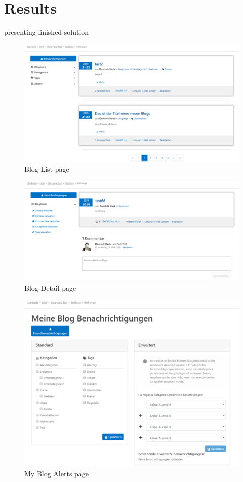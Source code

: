 \documentclass[Bachelor,BIF,english]{twbook}
\begin{document}
\section{Results}
presenting finished solution
\begin{figure}[!htbp]
\centering
\includegraphics[width=1\linewidth]{PICs/blog_list_page.eps}
\caption{Blog List page}\label{FigBlogList}
\end{figure}
\begin{figure}[!htbp]
\centering
\includegraphics[width=1\linewidth]{PICs/blog_detail_page.eps}
\caption{Blog Detail page}\label{FigBlogDetail}
\end{figure}
\begin{figure}[!htbp]
\centering
\includegraphics[width=1\linewidth]{PICs/my_blog_alerts_page.eps}
\caption{My Blog Alerts page}\label{FigMyAlerts}
\end{figure}
\end{document}
